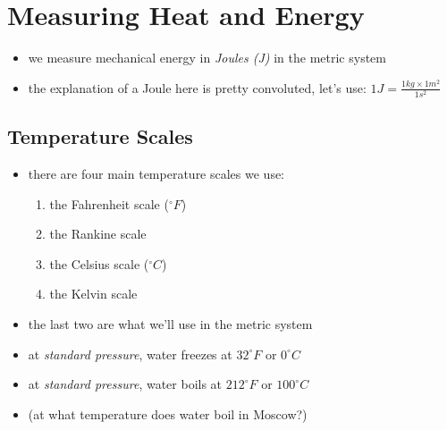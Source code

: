 \documentclass[11pt, oneside]{article}   	%
\begin{document}
\section{Measuring Heat and Energy}
\begin{itemize}
\item we measure mechanical energy in \emph{Joules (J)} in the metric system
\item the explanation of a Joule here is pretty convoluted, let's use: $1J = \frac{1kg \times 1 m^{2}}{1 s^{2}}$
\end{itemize}

\subsection{Temperature Scales}
\begin{itemize}
\item there are four main temperature scales we use:
\begin{enumerate}
\item the Fahrenheit scale ($^{\circ} F$)
\item the Rankine scale
\item the Celsius scale ($^{\circ} C$)
\item the Kelvin scale
\end{enumerate}
\item the last two are what we'll use in the metric system
\item at \emph{standard pressure}, water freezes at $32^{\circ} F$ or $0^{\circ} C$
\item at \emph{standard pressure}, water boils at $212^{\circ} F$ or $100^{\circ} C$ 
\item (at what temperature does water boil in Moscow?)
\end{itemize}




\nocite{wile-chem-2}
{}

\end{document}
